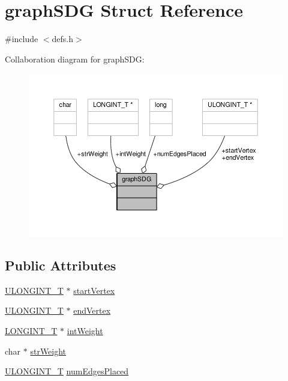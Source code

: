 \hypertarget{structgraphSDG}{\section{graph\-S\-D\-G Struct Reference}
\label{structgraphSDG}
}


{\ttfamily \#include $<$defs.\-h$>$}



Collaboration diagram for graph\-S\-D\-G\-:
\nopagebreak
\begin{figure}[H]
\begin{center}
\leavevmode
\includegraphics[width=350pt]{structgraphSDG__coll__graph}
\end{center}
\end{figure}
\subsection*{Public Attributes}
\begin{DoxyCompactItemize}
\item 
\hyperlink{defs_8h_ade719b705ff384b386384c9385517e0b}{U\-L\-O\-N\-G\-I\-N\-T\-\_\-\-T} $\ast$ \hyperlink{structgraphSDG_a2d4d5a9d81aadcf57fa4e109268e488e}{start\-Vertex}
\item 
\hyperlink{defs_8h_ade719b705ff384b386384c9385517e0b}{U\-L\-O\-N\-G\-I\-N\-T\-\_\-\-T} $\ast$ \hyperlink{structgraphSDG_a01b376c08140c3924d45b02c18af08fb}{end\-Vertex}
\item 
\hyperlink{defs_8h_a9408c2d3d0a808675815ba4d87712087}{L\-O\-N\-G\-I\-N\-T\-\_\-\-T} $\ast$ \hyperlink{structgraphSDG_ae8a9e6304f35e933100403b32314d546}{int\-Weight}
\item 
char $\ast$ \hyperlink{structgraphSDG_a4ea8dc332c157359a35b7a31119a178b}{str\-Weight}
\item 
\hyperlink{defs_8h_ade719b705ff384b386384c9385517e0b}{U\-L\-O\-N\-G\-I\-N\-T\-\_\-\-T} \hyperlink{structgraphSDG_a88c2b749529e21812025588b679f74ae}{num\-Edges\-Placed}
\end{DoxyCompactItemize}


